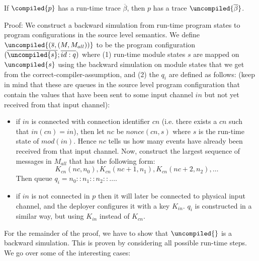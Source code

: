 \begin{lemma}\label{lem:prog2}
If $\compiled{p}$ has a run-time trace $\overline{\beta}$, then $p$ has a trace $\uncompiled{\overline{\beta}}$.
\end{lemma}
Proof: We construct a backward simulation from run-time program states to program configurations in the source level semantics.
We define $\uncompiled{(\overline{s},(M,M_{all}))}$ to be the program configuration $(\overline{\uncompiled{s}}; \overline{id:q})$ where (1) run-time module
states $s$ are mapped on $\uncompiled{s}$ using the backward simulation on module states that we get from the correct-compiler-assumption, and (2) 
the $q_i$ are defined as follows: (keep in mind that these are queues in the source level program configuration that contain the values that have been sent to some input channel $in$ but
not yet received from that input channel): 
\begin{itemize}
\item if $in$ is connected with connection identifier $cn$ (i.e. there exists a $cn$ such that $in(cn) = in$), then
let $nc$ be $nonce(cn,s)$ where $s$ is the run-time state of $mod(in)$. Hence $nc$ tells us how many events have already been received from that input channel. Now, construct the largest sequence of messages in $M_{all}$ that
has the following form:
$$
K_{cn}(nc,n_0), K_{cn}(nc+1,n_1), K_{cn}(nc+2,n_2), \ldots
$$
Then queue $q_i = n_0::n_1::n_2::\ldots$.
\item if $in$ is not connected in $p$ then it will later be connected to physical input channel, and the deployer configures it with a key $K_{in}$. 
$q_i$ is constructed in a similar way, but using $K_{in}$ instead of $K_{cn}$.
\end{itemize}
For the remainder of the proof, we have to show that $\uncompiled{}$ is a backward simulation. This is proven  by considering all possible run-time steps. We go over some
of the interesting cases:
